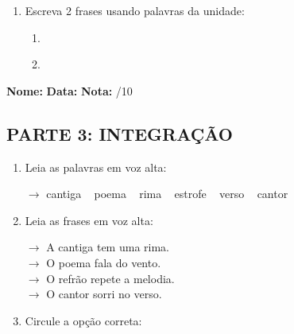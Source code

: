 \begin{exercicio}
\begin{enumerate}[resume]
  \item Escreva 2 frases usando palavras da unidade:
  \begin{enumerate}[label=\alph*)]
    \item \underline{\hspace{8cm}}
    \item \underline{\hspace{8cm}}
  \end{enumerate}

\end{enumerate}

\end{exercicio}



\begin{exercicio}

\noindent\textbf{Nome:} \underline{\hspace{3.2cm}} \quad \textbf{Data:} \underline{\hspace{1.6cm}} \quad \textbf{Nota:} \underline{\hspace{0.9cm}}/10


\subsection*{PARTE 3: INTEGRAÇÃO}

\begin{enumerate}[resume]

  \item Leia as palavras em voz alta:
  \begin{center}
  $\rightarrow$ cantiga ~ poema ~ rima ~ estrofe ~ verso ~ cantor
  \end{center}

  \item Leia as frases em voz alta:
  \begin{center}
  $\rightarrow$ A cantiga tem uma rima.\\
  $\rightarrow$ O poema fala do vento.\\
  $\rightarrow$ O refrão repete a melodia.\\
  $\rightarrow$ O cantor sorri no verso.\\
  \end{center}

  \item Circule a opção correta:
  \begin{enumerate}[label=(\alph*)]


\end{enumerate}
\end{enumerate}
\end{exercicio}
